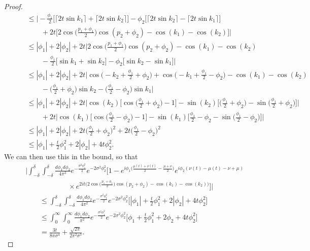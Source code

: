 \documentclass[../thesis-main/thesis-main]{subfiles}
\begin{document}
\begin{proof}
\begin{align}
  & \qquad \leq \bigg|-\frac{\phi_1}{2} \big[ \lceil 2 t \sin k_1\rceil + \lceil 2t \sin k_2\rceil \big] - \phi_2 \big[ \lceil 2 t \sin k_2\rceil - \lceil 2t \sin k_1\rceil\big]  \nonumber\\
  &\qquad \qquad + 2 t \Big[ 2 \cos\Big( \frac{p_1 +\phi_1}{2}\Big) \cos(p_2 + \phi_2) - \cos(k_1) - \cos(k_2) \Big]\bigg|\\
  & \qquad \leq |\phi_1| + 2 |\phi_2| + 2 t \bigg| 2\cos\Big( \frac{p_1 +\phi_1}{2}\Big) \cos(p_2 + \phi_2) - \cos(k_1) - \cos(k_2)  \nonumber\\
  & \qquad \qquad - \frac{\phi_1}{2} \big[ \sin k_1 +   \sin k_2\big] - \phi_2 \big[  \sin k_2 -  \sin k_1\big]\bigg|\\
  &  \qquad \leq |\phi_1| + 2 |\phi_2| + 2 t \bigg| \cos\Big(- k_2 + \frac{\phi_1}{2} + \phi_2 \Big)  + \cos\Big(- k_1 + \frac{\phi_1}{2} - \phi_2 \Big)- \cos(k_1) - \cos(k_2)  \nonumber\\
  & \qquad \qquad - \Big(\frac{\phi_1}{2} + \phi_2 \Big)\sin k_2  -\Big(\frac{\phi_1}{2} -  \phi_2\Big) \sin k_1 \bigg|\\
  & \qquad \leq |\phi_1| + 2 |\phi_2| + 2 t \bigg| \cos(k_2) \big[\cos\big( \frac{\phi_1}{2} + \phi_2 \big) - 1\big] - \sin(k_2) \big[\big( \frac{\phi_1}{2} + \phi_2 \big) - \sin\big( \frac{\phi_1}{2} + \phi_2 \big) \big]  \bigg|\nonumber\\
  & \qquad \qquad + 2t \bigg| \cos(k_1) \Big[\cos\Big(\frac{\phi_1}{2} - \phi_2 \Big) - 1 \Big] - \sin(k_1) \Big[ \frac{\phi_1}{2} - \phi_2 - \sin\Big(  \frac{\phi_1}{2} - \phi_2\Big) \Big] \bigg|\\
  & \qquad \leq |\phi_1| + 2 |\phi_2| + 2 t  \Big (\frac{\phi_1}{2} + \phi_2\Big)^2 + 2t \Big( \frac{\phi_1}{2} - \phi_2\Big)^2\\
  & \qquad \leq |\phi_1| +\frac{t}{2} \phi_1^2 + 2 |\phi_2| + 4 t\phi_2^2.
\end{align}
We can then use this in the bound, so that
\begin{align}
  & \Bigg| \int_{-\delta}^\delta \int_{-\delta}^\delta \frac{d\phi_1 d\phi_2}{4\pi^2}  e^{ -\frac{ \sigma^2 \phi_1^2}{2}} e^{ -2\sigma^2 \phi_2^2} \bigg[ 1 - e^{i \phi_1 \big(\frac{\mu(t) + \nu(t)}{2} - \frac{\mu +\nu}{2} \big)} e^{i  \phi_2 (\nu(t) - \mu(t) -\nu + \mu)}\nonumber\\
  & \qquad \qquad \qquad \times e^{ 2 i t\big( 2 \cos\big(\frac{p_1+\phi_1}{2}\big)\cos(p_2+\phi_2) - \cos(k_1) - \cos(k_2)\big)}\bigg] \Bigg|\nonumber\\
  & \qquad \leq  \int_{-\delta}^\delta \int_{-\delta}^\delta \frac{d\phi_1 d\phi_2}{4\pi^2}  e^{ -\frac{ \sigma^2 \phi_1^2}{2}} e^{ -2\sigma^2 \phi_2^2} \Big[|\phi_1| + \frac{t}{2} \phi_1^2 + 2 |\phi_2| + 4 t \phi_2^2 \Big]\\
  & \qquad \leq  \int_{0}^\infty \int_{0}^\infty \frac{d\phi_1 d\phi_2}{\pi^2}  e^{ -\frac{ \sigma^2 \phi_1^2}{2}} e^{ -2\sigma^2 \phi_2^2} \Big[\phi_1 + \frac{t}{2} \phi_1^2 + 2 \phi_2+ 4 t \phi_2^2 \Big]\\
  &\qquad = \frac{3 t}{8\pi \sigma^4} + \frac{\sqrt{2\pi}}{2\pi^2 \sigma^3}.
\end{align}


\end{proof}
\end{document}
